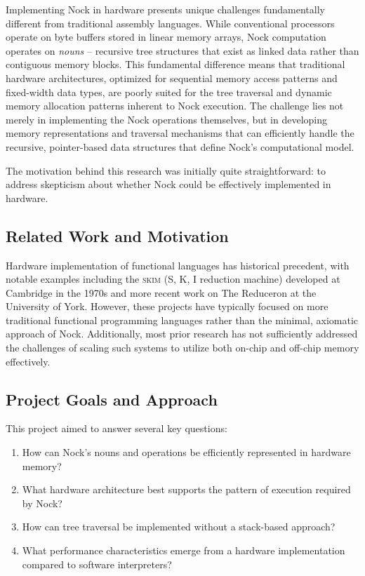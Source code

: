 \documentclass[twoside]{article}
\begin{document}
Implementing Nock in hardware presents unique challenges fundamentally different from traditional assembly languages. While conventional processors operate on byte buffers stored in linear memory arrays, Nock computation operates on \textit{nouns} -- recursive tree structures that exist as linked data rather than contiguous memory blocks. This fundamental difference means that traditional hardware architectures, optimized for sequential memory access patterns and fixed-width data types, are poorly suited for the tree traversal and dynamic memory allocation patterns inherent to Nock execution. The challenge lies not merely in implementing the Nock operations themselves, but in developing memory representations and traversal mechanisms that can efficiently handle the recursive, pointer-based data structures that define Nock's computational model.

The motivation behind this research was initially quite straightforward: to address skepticism about whether Nock could be effectively implemented in hardware.

\subsection{Related Work and Motivation}

Hardware implementation of functional languages has historical precedent, with notable examples including the \textsc{skim} (S, K, I reduction machine) developed at Cambridge in the 1970s and more recent work on The Reduceron at the University of York. However, these projects have typically focused on more traditional functional programming languages rather than the minimal, axiomatic approach of Nock. Additionally, most prior research has not sufficiently addressed the challenges of scaling such systems to utilize both on-chip and off-chip memory effectively.

\subsection{Project Goals and Approach}

This project aimed to answer several key questions:

\begin{enumerate}
  \item How can Nock's nouns and operations be efficiently represented in hardware memory?
  \item What hardware architecture best supports the pattern of execution required by Nock?
  \item How can tree traversal be implemented without a stack-based approach?
  \item What performance characteristics emerge from a hardware implementation compared to software interpreters?
\end{enumerate}
\end{document}

